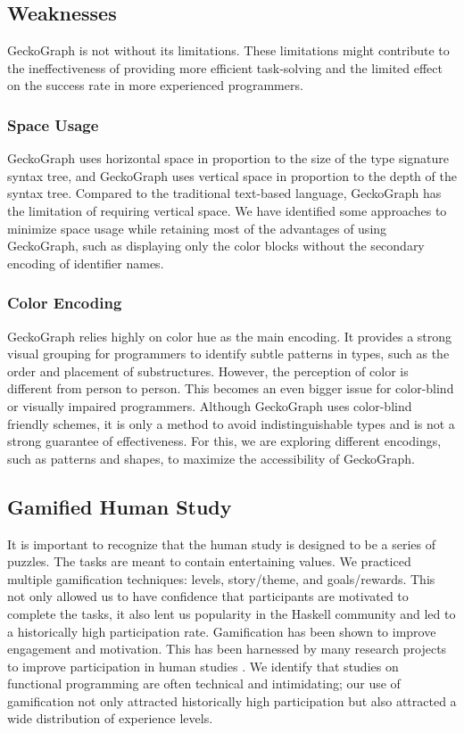 \subsection{Weaknesses}
GeckoGraph is not without its limitations. These limitations might contribute to the ineffectiveness of providing more efficient task-solving and the limited effect on the success rate in more experienced programmers. 

\subsubsection{Space Usage}\label{subsec:space}
GeckoGraph uses horizontal space in proportion to the size of the type signature syntax tree, and GeckoGraph uses vertical space in proportion to the depth of the syntax tree. Compared to the traditional text-based language, GeckoGraph has the limitation of requiring vertical space. We have identified some approaches to minimize space usage while retaining most of the advantages of using GeckoGraph, such as displaying only the color blocks without the secondary encoding of identifier names.


\subsubsection{Color Encoding}
GeckoGraph relies highly on color hue as the main encoding. It provides a strong visual grouping  \cite{Zeng2023-jz}  for programmers to identify subtle patterns in types, such as the order and placement of substructures. However, the perception of color is different from person to person. This becomes an even bigger issue for color-blind or visually impaired programmers. Although GeckoGraph uses color-blind friendly schemes, it is only a method to avoid indistinguishable types and is not a strong guarantee of effectiveness. For this, we are exploring different encodings, such as patterns and shapes, to maximize the accessibility of GeckoGraph. 


\subsection{Gamified Human Study}

It is important to recognize that the human study is designed to be a series of puzzles. The tasks are meant to contain entertaining values. We practiced multiple gamification techniques: levels, story/theme, and goals/rewards. \cite{Hamari2014-mc} This not only allowed us to have confidence that participants are motivated to complete the tasks, it also lent us popularity in the Haskell community and led to a historically high participation rate. Gamification has been shown to improve engagement and motivation. This has been harnessed by many research projects to improve participation in human studies \cite{He2014-vp}. We identify that studies on functional programming are often technical and intimidating; our use of gamification not only attracted historically high participation but also attracted a wide distribution of experience levels. 

